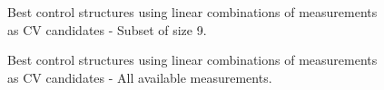 \documentclass[../../msc-thesis.tex]{subfiles}
\begin{document}
\begin{figure}[htb]
    \centering
    \caption{Best control structures using linear combinations of measurements 
    as CV candidates - Subset of size 9.}
    \label{fig:c3ss9}
\end{figure}

\begin{figure}[htb]
    \centering
    \caption{Best control structures using linear combinations of measurements 
    as CV candidates - All available measurements.}
    \label{fig:c3ssall}
\end{figure}

\FloatBarrier
\end{document}
